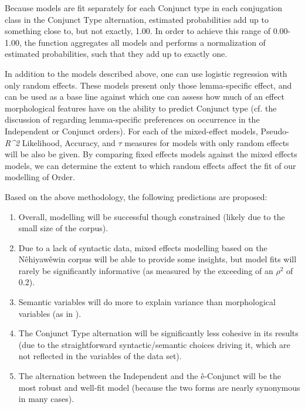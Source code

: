 Because models are fit separately for each Conjunct type in each conjugation class in the Conjunct Type alternation, estimated probabilities add up to something close to, but not exactly, 1.00. In order to achieve this range of 0.00-1.00, the  function \citep{polytomous} aggregates all models and performs a normalization of estimated probabilities, such that they add up to exactly one.

In addition to the models described above, one can use logistic regression with only random effects. These models present only those lemma-specific effect, and can be used as a base line against which one can assess how much of an effect morphological features have on the ability to predict Conjunct type (cf. the discussion of \citet{HarriganArppe2015} regarding lemma-specific preferences on occurrence in the Independent or Conjunct orders). For each of the mixed-effect models, Pseudo-\textit{R^{2}} Likelihood, Accuracy, and $\tau$ measures for models with only random effects will be also be given. By comparing fixed effects models against the mixed effects models, we can determine the extent to which random effects affect the fit of our modelling of Order.

Based on the above methodology, the following predictions are proposed:

\begin{enumerate}
    \item Overall, modelling will be successful though constrained (likely due to the small size of the corpus).
    \item Due to a lack of syntactic data, mixed effects modelling based on the Nêhiyawêwin corpus will be able to provide some insights, but model fits will rarely be significantly informative (as measured by the exceeding of an $\rho^{2}$ of 0.2).
    \item Semantic variables will do more to explain variance than morphological variables (as in \citep{arppe2008univariate}).
    \item The Conjunct Type alternation will be significantly less cohesive in its results (due to the straightforward syntactic/semantic choices driving it, which are not reflected in the variables of the data set).
    \item The alternation between the Independent and the ê-Conjunct will be the most robust and well-fit model (because the two forms are nearly synonymous in many cases).
\end{enumerate}